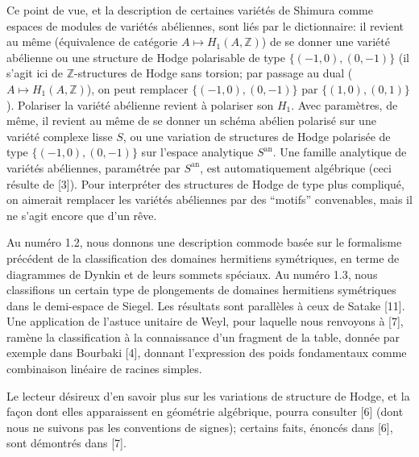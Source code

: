 \documentclass[12pt,a4paper]{article}
\theoremstyle{plain}
\theoremstyle{definition}
\theoremstyle{remark}
\newcommand{\ZZ}{\mathbb{Z}}
\begin{document}
Ce point de vue, et la description de certaines vari\'et\'es de Shimura comme espaces de modules de vari\'et\'es ab\'eliennes, sont li\'es par le dictionnaire: il revient au m\^eme (\'equivalence de cat\'egorie $A \mapsto H_1(A,\ZZ)$) de se donner une vari\'et\'e ab\'elienne ou une structure de Hodge polarisable de type $\{(-1,0),(0,-1)\}$ (il s'agit ici de $\ZZ$-structures de Hodge sans torsion; par passage au dual ($A \mapsto H_1(A,\ZZ)$), on peut remplacer $\{(-1,0),(0,-1)\}$ par $\{(1,0),(0,1)\}$). Polariser la vari\'et\'e ab\'elienne revient \`a polariser son $H_1$. Avec param\`etres, de m\^eme, il revient au m\^eme de se donner un sch\'ema ab\'elien polaris\'e sur une vari\'et\'e complexe lisse $S$, ou une variation de structures de Hodge polaris\'ee de type $\{(-1,0),(0,-1)\}$ sur l'espace analytique $S^{\text{an}}$. Une famille analytique de vari\'et\'es ab\'eliennes, param\'etr\'ee par $S^{\text{an}}$, est automatiquement alg\'ebrique (ceci r\'esulte de [3]). Pour interpr\'eter des structures de Hodge de type plus compliqu\'e, on aimerait remplacer les vari\'et\'es ab\'eliennes par des ``motifs'' convenables, mais il ne s'agit encore que d'un r\^eve.

Au num\'ero 1.2, nous donnons une description commode bas\'ee sur le formalisme pr\'ec\'edent de la classification des domaines hermitiens sym\'etriques, en terme de diagrammes de Dynkin et de leurs sommets sp\'eciaux. Au num\'ero 1.3, nous classifions un certain type de plongements de domaines hermitiens sym\'etriques dans le demi-espace de Siegel. Les r\'esultats sont parall\`eles \`a ceux de Satake [11]. Une application de l'astuce unitaire de Weyl, pour laquelle nous renvoyons \`a [7], ram\`ene la classification \`a la connaissance d'un fragment de la table, donn\'ee par exemple dans Bourbaki [4], donnant l'expression des poids fondamentaux comme combinaison lin\'eaire de racines simples.

Le lecteur d\'esireux d'en savoir plus sur les variations de structure de Hodge, et la fa\c{c}on dont elles apparaissent en g\'eom\'etrie alg\'ebrique, pourra consulter [6] (dont nous ne suivons pas les conventions de signes); certains faits, \'enonc\'es dans [6], sont d\'emontr\'es dans [7].
\end{document}
